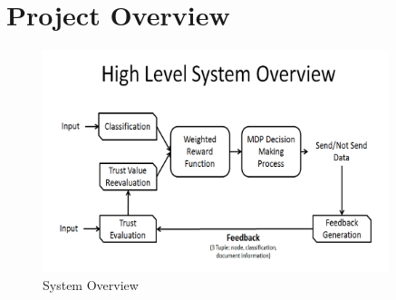 \section{Project Overview}
\FloatBarrier
\begin{figure}[h!]
    \begin{center}
        \includegraphics[width=0.90\textwidth]{Figures/HighLevelOverview.PNG}
        \caption{System Overview}
        \label{fig:SystemOverview}
    \end{center}
\end{figure}


